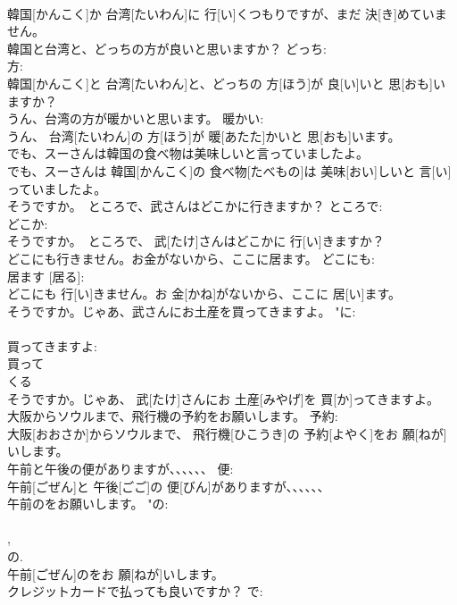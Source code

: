 \documentclass[8pt]{extreport}
\begin{document}
\begin{CJK}{UTF8}{min}
\\	韓国[かんこく]か 台湾[たいわん]に 行[い]くつもりですが、まだ 決[き]めていません。		
\\	韓国と台湾と、どっちの方が良いと思いますか？	どっち: 
\\	方: 
\\	韓国[かんこく]と 台湾[たいわん]と、どっちの 方[ほう]が 良[い]いと 思[おも]いますか？	
\\	うん、台湾の方が暖かいと思います。	暖かい: 
\\	うん、 台湾[たいわん]の 方[ほう]が 暖[あたた]かいと 思[おも]います。	
\\	でも、スーさんは韓国の食べ物は美味しいと言っていましたよ。	
\\	でも、スーさんは 韓国[かんこく]の 食べ物[たべもの]は 美味[おい]しいと 言[い]っていましたよ。	
\\	そうですか。　ところで、武さんはどこかに行きますか？	ところで: 
\\	どこか: 
\\	そうですか。　ところで、 武[たけ]さんはどこかに 行[い]きますか？		
\\	どこにも行きません。お金がないから、ここに居ます。	どこにも: 
\\	居ます [居る]: 
\\	どこにも 行[い]きません。お 金[かね]がないから、ここに 居[い]ます。		
\\	そうですか。じゃあ、武さんにお土産を買ってきますよ。	"に: 
\\	[お土産] 
\\	買ってきますよ: 
\\	買って 
\\	くる 
\\	そうですか。じゃあ、 武[たけ]さんにお 土産[みやげ]を 買[か]ってきますよ。		
\\	大阪からソウルまで、飛行機の予約をお願いします。	予約: 
\\	大阪[おおさか]からソウルまで、 飛行機[ひこうき]の 予約[よやく]をお 願[ねが]いします。	
\\	午前と午後の便がありますが、、、、、、	便: 
\\	午前[ごぜん]と 午後[ごご]の 便[びん]がありますが、、、、、、	
\\	午前のをお願いします。	"の: 
\\	[便] 
\\	[午前], 
\\	の. 
\\	午前[ごぜん]のをお 願[ねが]いします。		
\\	クレジットカードで払っても良いですか？	で: 

\end{CJK}
\end{document}
